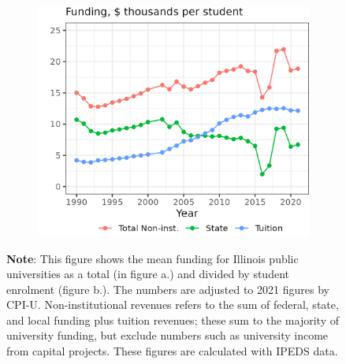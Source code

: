 \begin{figure}[H]
\begin{subfigure}[b]{0.495\textwidth}
        \includegraphics[width=\textwidth]{figures/illinois-funding-fte.png}
        \label{fig:illinois-funding-fte}
    \end{subfigure}
    \label{fig:illinois-funding}

    \justify
    \footnotesize
    \textbf{Note}:       
    This figure shows the mean funding for Illinois public universities as a total (in figure a.) and divided by student enrolment (figure b.).
    The numbers are adjusted to 2021 figures by CPI-U.
    Non-institutional revenues refers to the sum of federal, state, and local funding plus tuition revenues; these sum to the majority of university funding, but exclude numbers such as university income from capital projects.
    These figures are calculated with IPEDS data.
\end{figure}

